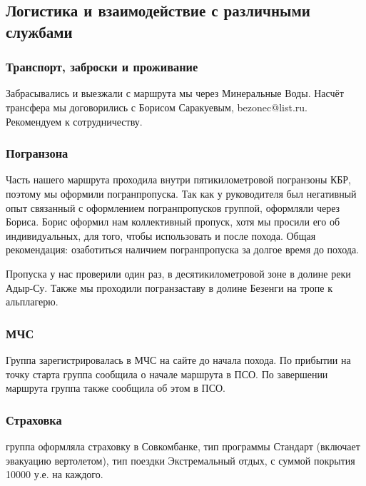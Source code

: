 	\subsection{Логистика и взаимодействие с различными службами}
		\subsubsection{Транспорт, заброски и проживание}
		Забрасывались и выезжали с маршрута мы через Минеральные Воды. Насчёт трансфера мы договорились с Борисом Саракуевым, bezonec@list.ru. Рекомендуем к сотрудничеству.

		\subsubsection{Погранзона}

		Часть нашего маршрута проходила внутри пятикилометровой погранзоны КБР, поэтому мы оформили погранпропуска. Так как у руководителя был негативный опыт связанный с оформлением погранпропусков группой, оформляли через Бориса. Борис оформил нам коллективный пропуск, хотя мы просили его об индивидуальных, для того, чтобы использовать и после похода. Общая рекомендация: озаботиться наличием погранпропуска за долгое время до похода.

		Пропуска у нас проверили один раз, в десятикилометровой зоне в долине реки Адыр-Су. Также мы проходили погранзаставу в долине Безенги на тропе к альплагерю.


		\subsubsection{МЧС}
		Группа зарегистрировалась в МЧС на сайте до начала похода. По прибытии на точку старта группа сообщила о начале маршрута в ПСО. По завершении маршрута группа также сообщила об этом в ПСО.



		\subsubsection{Страховка}
			группа оформляла страховку в Совкомбанке, тип программы Стандарт (включает эвакуацию вертолетом), тип поездки Экстремальный отдых, с суммой покрытия 10000 у.е. на каждого. 
 
